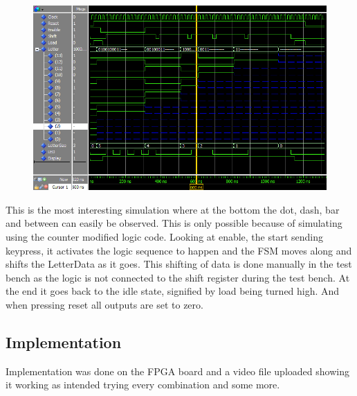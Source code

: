 \documentclass{article}
\begin{document}
\clearpage
\begin{figure}[h]
    \centering
    \includegraphics[width=1\textwidth]{Figures/LogicTB.PNG}
    \label{fig:TB_Logic}
\end{figure}
This is the most interesting simulation where at the bottom the dot, dash, bar and between can easily be observed. This is only possible because of simulating using the counter modified logic code. Looking at enable, the start sending keypress, it activates the logic sequence to happen and the FSM moves along and shifts the LetterData as it goes. This shifting of data is done manually in the test bench as the logic is not connected to the shift register during the test bench. At the end it goes back to the idle state, signified by load being turned high. And when pressing reset all outputs are set to zero.

\subsection{Implementation}
Implementation was done on the FPGA board and a video file uploaded showing it working as intended trying every combination and some more.

\end{document}
